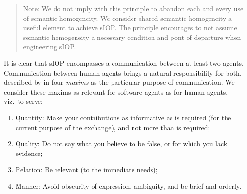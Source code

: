 \documentclass[sort&compress,preprint,authoryear,3p,twocolumn]{elsarticle}
\providecommand{\tightlist}{%
  \setlength{\itemsep}{0pt}\setlength{\parskip}{0pt}}
\begin{document}
\begin{quote}
Note: We do not imply with this principle to abandon each and every use
of semantic homogeneity. We consider shared semantic homogeneity a
useful element to achieve sIOP. The principle encourages to not assume
semantic homogeneity a necessary condition and pont of departure when
engineering sIOP.
\end{quote}

It is clear that sIOP encompasses a communication between at least two
agents. Communication between human agents brings a natural
responsibility for both, described by \citep{Grice:1991BT} in four
\emph{maxims} as the particular purpose of communication. We consider
these maxims as relevant for software agents as for human agents,
viz.~to serve:

\begin{enumerate}
\def\labelenumi{\arabic{enumi}.}
\tightlist
\item
  Quantity: Make your contributions as informative as is required (for
  the current purpose of the exchange), and not more than is required;
\item
  Quality: Do not say what you believe to be false, or for which you
  lack evidence;
\item
  Relation: Be relevant (to the immediate needs);
\item
  Manner: Avoid obscurity of expression, ambiguity, and be brief and
  orderly.
\end{enumerate}
\end{document}
